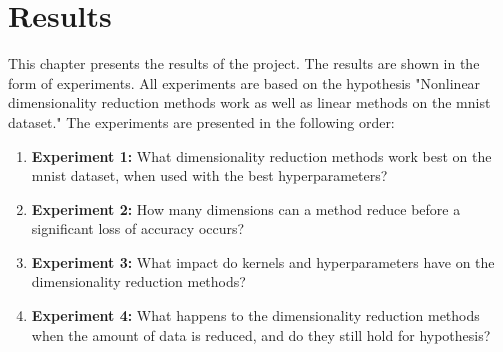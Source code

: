 \chapter{Results}\label{cha:results}
This chapter presents the results of the project. The results are shown in the form of experiments. All experiments are based on the hypothesis "Nonlinear dimensionality reduction methods work as well as linear methods on the \gls{mnist} dataset."
The experiments are presented in the following order:
\begin{enumerate}
    \item \textbf{Experiment 1:} What dimensionality reduction methods work best on the \gls{mnist} dataset, when used with the best hyperparameters?
    \item \textbf{Experiment 2:} How many dimensions can a method reduce before a significant loss of accuracy occurs?
    \item \textbf{Experiment 3:} What impact do kernels and hyperparameters have on the dimensionality reduction methods?
    \item \textbf{Experiment 4:} What happens to the dimensionality reduction methods when the amount of data is reduced, and do they still hold for hypothesis?
\end{enumerate}


    


    
